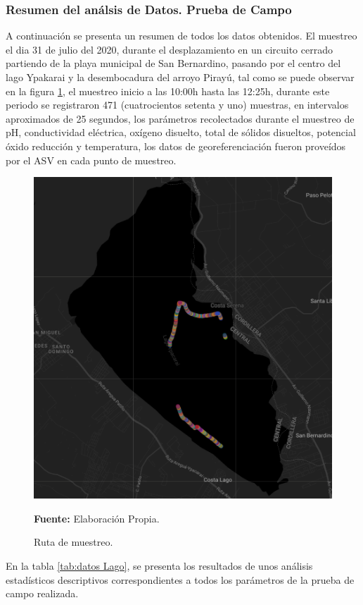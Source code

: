 \subsubsection{Resumen del an\'alsis de Datos. Prueba de Campo}
A continuaci\'on se presenta un resumen de todos los datos obtenidos.
El muestreo el dia 31 de julio del 2020, durante el desplazamiento en un circuito cerrado partiendo de la playa municipal de San Bernardino, pasando por el centro del lago Ypakarai  y la desembocadura del arroyo Piray\'u, tal como se puede observar en la figura \ref{fig:ruta}, el muestreo inicio a las 10:00h hasta las 12:25h, durante este periodo se registraron 471 (cuatrocientos setenta y uno) muestras, en intervalos aproximados de 25 segundos, los par\'ametros  recolectados durante el muestreo de pH, conductividad el\'ectrica, ox\'igeno disuelto, total de s\'olidos disueltos, potencial \'oxido reducci\'on y temperatura, los datos de georeferenciaci\'on fueron prove\'idos por el ASV en cada punto de muestreo.
\begin{figure}[H]
        \centering
        \includegraphics[width=0.8\linewidth]{Imagenes/cap4/Recorrido.png}
        \caption {Ruta de muestreo. }{\textbf{Fuente:}
        Elaboraci\'on Propia. }
        \label{fig:ruta}
\end{figure}

En la tabla \ref{tab:datos Lago}, se presenta los resultados de unos an\'alisis estadísticos descriptivos correspondientes a todos los par\'ametros de la prueba de campo realizada.

